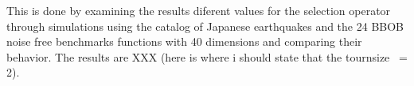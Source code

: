  This is done by examining the results diferent values for the selection operator through simulations using the catalog of Japanese earthquakes and the 24 BBOB noise free benchmarks functions with 40 dimensions and comparing their behavior. The results are XXX (here is where i should state that the tournsize ~= 2).